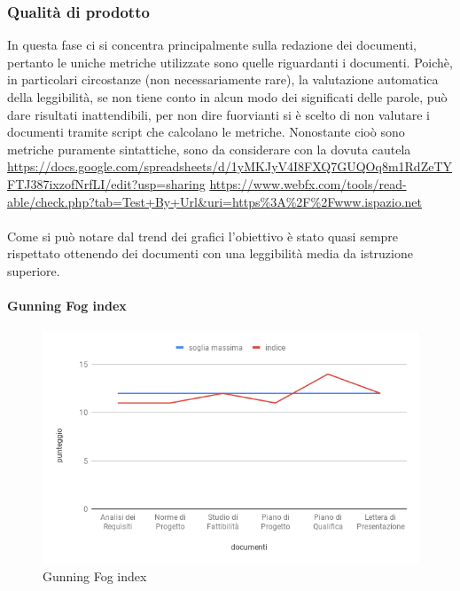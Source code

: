 \subsubsection{Qualità di prodotto}
In questa fase ci si concentra principalmente sulla redazione dei documenti, pertanto le uniche metriche utilizzate sono quelle riguardanti i documenti.
Poichè, in particolari circostanze (non necessariamente rare), la valutazione automatica della leggibilità, se non tiene conto in alcun modo dei significati delle parole, può dare risultati inattendibili, per non dire fuorvianti si è scelto di non valutare i documenti tramite script che calcolano le metriche.
Nonostante cioò sono metriche puramente sintattiche, sono da considerare con la dovuta cautela \\
\url{https://docs.google.com/spreadsheets/d/1yMKJyV4I8FXQ7GUQOq8m1RdZeTYFTJ387ixzofNrfLI/edit?usp=sharing}
\url{https://www.webfx.com/tools/read-able/check.php?tab=Test+By+Url&uri=https%3A%2F%2Fwww.ispazio.net}
	 \\ \\
	Come si può notare dal trend dei grafici l'obiettivo è stato quasi sempre rispettato ottenendo dei documenti con una leggibilità media da istruzione superiore.
	\clearpage
\paragraph{Gunning Fog index}
\hspace{15cm}
\begin{figure}[h!]
	\centering
	\includegraphics[scale=0.5]{GunningFogIndex.png}
	\caption{Gunning Fog index}

\end{figure}
